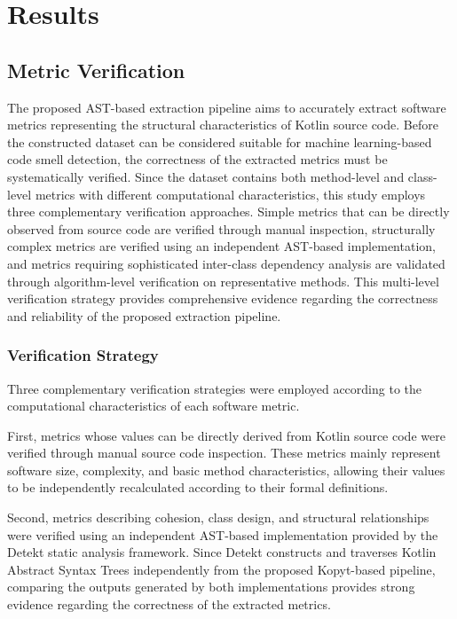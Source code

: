 \documentclass[]{einformatica}
\begin{document}
\section{Results}\label{sec:Results}

\subsection{Metric Verification}

The proposed AST-based extraction pipeline aims to accurately extract software metrics representing the structural characteristics of Kotlin source code. Before the constructed dataset can be considered suitable for machine learning-based code smell detection, the correctness of the extracted metrics must be systematically verified. Since the dataset contains both method-level and class-level metrics with different computational characteristics, this study employs three complementary verification approaches. Simple metrics that can be directly observed from source code are verified through manual inspection, structurally complex metrics are verified using an independent AST-based implementation, and metrics requiring sophisticated inter-class dependency analysis are validated through algorithm-level verification on representative methods. This multi-level verification strategy provides comprehensive evidence regarding the correctness and reliability of the proposed extraction pipeline.

\subsubsection{Verification Strategy}

Three complementary verification strategies were employed according to the computational characteristics of each software metric.

First, metrics whose values can be directly derived from Kotlin source code were verified through manual source code inspection. These metrics mainly represent software size, complexity, and basic method characteristics, allowing their values to be independently recalculated according to their formal definitions.

Second, metrics describing cohesion, class design, and structural relationships were verified using an independent AST-based implementation provided by the Detekt static analysis framework. Since Detekt constructs and traverses Kotlin Abstract Syntax Trees independently from the proposed Kopyt-based pipeline, comparing the outputs generated by both implementations provides strong evidence regarding the correctness of the extracted metrics.
\end{document}
